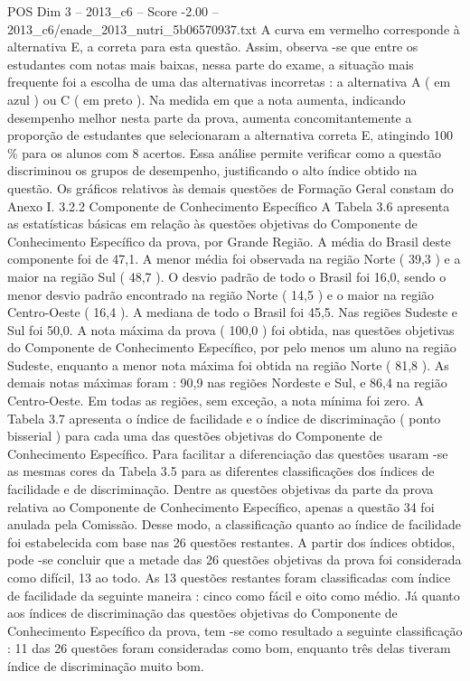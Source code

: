 \begin{textsample}{POS Dim 3 – 2013\_c6 – Score -2.00 – 2013\_c6/enade\_2013\_nutri\_5b06570937.txt}
A curva em vermelho corresponde à alternativa E, a correta para esta questão.
Assim, observa -se que entre os estudantes com notas mais baixas, nessa parte do exame, a situação mais frequente foi a escolha de uma das alternativas incorretas : a alternativa A ( em azul ) ou C ( em preto ).
Na medida em que a nota aumenta, indicando desempenho melhor nesta parte da prova, aumenta concomitantemente a proporção de estudantes que selecionaram a alternativa correta E, atingindo 100 \% para os alunos com 8 acertos.
Essa análise permite verificar como a questão discriminou os grupos de desempenho, justificando o alto índice obtido na questão.
Os gráficos relativos às demais questões de Formação Geral constam do Anexo I. 3.2.2 Componente de Conhecimento Específico A Tabela 3.6 apresenta as estatísticas básicas em relação às questões objetivas do Componente de Conhecimento Específico da prova, por Grande Região.
A média do Brasil deste componente foi de 47,1.
A menor média foi observada na região Norte ( 39,3 ) e a maior na região Sul ( 48,7 ).
O desvio padrão de todo o Brasil foi 16,0, sendo o menor desvio padrão encontrado na região Norte ( 14,5 ) e o maior na região Centro-Oeste ( 16,4 ).
A mediana de todo o Brasil foi 45,5.
Nas regiões Sudeste e Sul foi 50,0.
A nota máxima da prova ( 100,0 ) foi obtida, nas questões objetivas do Componente de Conhecimento Específico, por pelo menos um aluno na região Sudeste, enquanto a menor nota máxima foi obtida na região Norte ( 81,8 ).
As demais notas máximas foram : 90,9 nas regiões Nordeste e Sul, e 86,4 na região Centro-Oeste.
Em todas as regiões, sem exceção, a nota mínima foi zero.
A Tabela 3.7 apresenta o índice de facilidade e o índice de discriminação ( ponto bisserial ) para cada uma das questões objetivas do Componente de Conhecimento Específico.
Para facilitar a diferenciação das questões usaram -se as mesmas cores da Tabela 3.5 para as diferentes classificações dos índices de facilidade e de discriminação.
Dentre as questões objetivas da parte da prova relativa ao Componente de Conhecimento Específico, apenas a questão 34 foi anulada pela Comissão.
Desse modo, a classificação quanto ao índice de facilidade foi estabelecida com base nas 26 questões restantes.
A partir dos índices obtidos, pode -se concluir que a metade das 26 questões objetivas da prova foi considerada como difícil, 13 ao todo.
As 13 questões restantes foram classificadas com índice de facilidade da seguinte maneira : cinco como fácil e oito como médio.
Já quanto aos índices de discriminação das questões objetivas do Componente de Conhecimento Específico da prova, tem -se como resultado a seguinte classificação : 11 das 26 questões foram consideradas como bom, enquanto três delas tiveram índice de discriminação muito bom.

\end{textsample}
